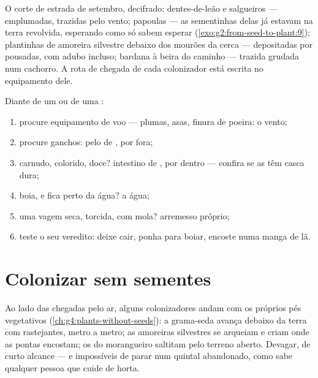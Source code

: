 \begin{example}\label{ex:g6:how-plants-spread:roadside}
O corte de estrada de setembro, decifrado: dentes-de-leão e
salgueiros ---  emplumadas, trazidas pelo vento; papoulas ---
as sementinhas delas já estavam na terra revolvida, esperando como só
 sabem esperar (\cref{exo:g2:from-seed-to-plant:9});
plantinhas de amoreira silvestre debaixo dos mourões da cerca ---
depositadas por  pousadas, com adubo incluso; bardana à beira do
caminho --- trazida grudada num cachorro. A rota de chegada de cada
colonizador está escrita no equipamento dele.
\end{example}

\begin{method}\label{met:g6:how-plants-spread:name}
Diante de um  ou de uma :
\begin{enumerate}
  \item procure equipamento de voo --- plumas, asas, finura de
        poeira: o vento;
  \item procure ganchos: pelo de , por fora;
  \item carnudo, colorido, doce? intestino de , por dentro ---
        confira se as  têm casca dura;
  \item boia, e fica perto da água? a água;
  \item uma vagem seca, torcida, com mola? arremesso próprio;
  \item teste o seu veredito: deixe cair, ponha para boiar, encoste
        numa manga de lã.
\end{enumerate}
\end{method}

\section{Colonizar sem sementes}

\begin{example}\label{ex:g6:how-plants-spread:vegetative}
Ao lado das chegadas pelo ar, alguns colonizadores andam com os
próprios pés vegetativos (\cref{ch:g4:plants-without-seeds}): a
grama-seda avança debaixo da terra com  rastejantes, metro a
metro; as amoreiras silvestres se arqueiam e criam  onde as
pontas encostam; os  do morangueiro saltitam pelo terreno
aberto. Devagar, de curto alcance --- e impossíveis de parar num
quintal abandonado, como sabe qualquer pessoa que cuide de horta.
\end{example}

